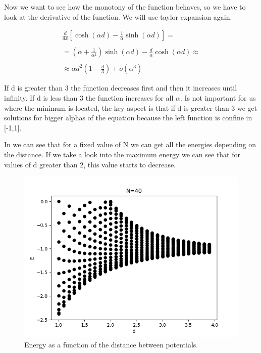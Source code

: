 Now we want to see how the monotony of the function behaves, so we have to look at the derivative of the function. We will use taylor expansion again.


\begin{equation}
  \label{5.25}
  \begin{array}{c}
    \frac{d}{dx}\left[\cosh{(\alpha d)} - \frac{1}{\alpha} \sinh{(\alpha d)} \right] =
    \\

    \\
    = \left(\alpha + \frac{1}{\alpha^2}\right)\sinh{(\alpha d)} -\frac{d}{\alpha}\cosh{(\alpha d)} \approx
    \\

    \\
    \approx \alpha d^2 (1-\frac{d}{3}) + o(\alpha^3)
  \end{array}
\end{equation}

If d is greater than 3 the function decreases first and then it increases until infinity. If d is less than 3 the function increases for all $\alpha$. Is not important for us where the minimum is located, the key aspect is that if d is greater than 3 we get solutions for bigger alphas of the equation because the left function is confine in [-1,1].

In  we can see that for a fixed value of N we can get all the energies depending on the distance. If we take a look into the maximum energy we can see that for values of d greater than 2, this value starts to decrease.

\begin{figure}[H]
  \includegraphics{images5/E_d_N=40.png}
  \centering
  \caption{Energy as a function of the distance between potentials.}
\end{figure}


